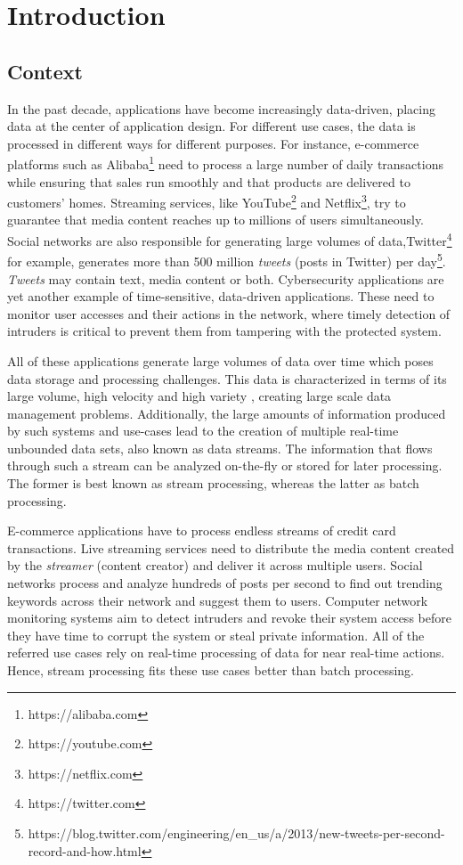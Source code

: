 \chapter{Introduction} \label{chap:intro} \minitoc

\section{Context} \label{sec:context}
In the past decade, applications have become increasingly data-driven, placing data at the center of application design. For different use cases, the data is processed in different ways for different purposes. For instance, e-commerce platforms such as Alibaba\footnote{https://alibaba.com} need to process a large number of daily transactions while ensuring that sales run smoothly and that products are delivered to customers' homes. Streaming services, like YouTube\footnote{https://youtube.com} and Netflix\footnote{https://netflix.com}, try to guarantee that media content reaches up to millions of users simultaneously. Social networks are also responsible for generating large volumes of data,Twitter\footnote{https://twitter.com} for example, generates more than 500 million \textit{tweets} (posts in Twitter) per day\footnote{https://blog.twitter.com/engineering/en\_us/a/2013/new-tweets-per-second-record-and-how.html}. \textit{Tweets} may contain text, media content or both. Cybersecurity applications are yet another example of time-sensitive, data-driven applications. These need to monitor user accesses and their actions in the network, where timely detection of intruders is critical to prevent them from tampering with the protected system.

All of these applications generate large volumes of data over time which poses data storage and processing challenges. This data is characterized in terms of its large volume, high velocity and high variety \cite{Mavragani-GoogleTrends-SLR}, creating large scale data management problems. Additionally, the large amounts of information produced by such systems and use-cases lead to the creation of multiple real-time unbounded data sets, also known as data streams. The information that flows through such a stream can be analyzed on-the-fly or stored for later processing. The former is best known as stream processing, whereas the latter as batch processing. 

E-commerce applications have to process endless streams of credit card transactions. Live streaming services need to distribute the media content created by the \textit{streamer} (content creator) and deliver it across multiple users. Social networks process and analyze hundreds of posts per second to find out trending keywords across their network and suggest them to users. Computer network monitoring systems aim to detect intruders and revoke their system access before they have time to corrupt the system or steal private information. All of the referred use cases rely on real-time processing of data for near real-time actions. Hence, stream processing fits these use cases better than batch processing.

